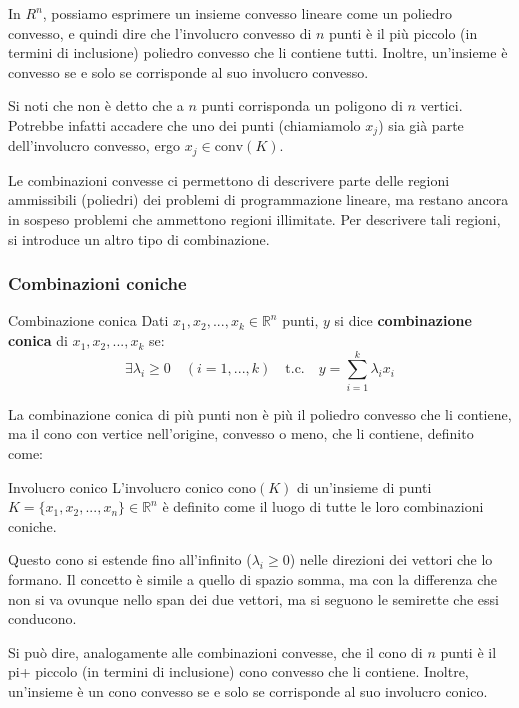 \documentclass[a4paper,11pt]{article}
\begin{document}
In $R^n$, possiamo esprimere un insieme convesso lineare come un poliedro convesso, e quindi dire che l'involucro convesso di $n$ punti è il più piccolo (in termini di inclusione) poliedro convesso che li contiene tutti.
Inoltre, un'insieme è convesso se e solo se corrisponde al suo involucro convesso.

Si noti che non è detto che a $n$ punti corrisponda un poligono di $n$ vertici.
Potrebbe infatti accadere che uno dei punti (chiamiamolo $x_j$) sia già parte dell'involucro convesso, ergo $x_j \in \mathrm{conv}(K)$.

Le combinazioni convesse ci permettono di descrivere parte delle regioni ammissibili (poliedri) dei problemi di programmazione lineare, ma restano ancora in sospeso problemi che ammettono regioni illimitate.
Per descrivere tali regioni, si introduce un altro tipo di combinazione.

\subsubsection{Combinazioni coniche}
\begin{definition}{Combinazione conica}
	Dati $ x_1, x_2, ..., x_k \in \mathbb{R}^n $ punti, $y$ si dice \textbf{combinazione conica} di $ x_1, x_2, ..., x_k $ se:
	$$
	\exists \lambda_i \geq 0 \quad (i = 1, ..., k) \quad \text{t.c.} \quad y = \sum_{i=1}^k \lambda_i x_i 
	$$
\end{definition}

La combinazione conica di più punti non è più il poliedro convesso che li contiene, ma il cono con vertice nell'origine, convesso o meno, che li contiene, definito come:
\begin{definition}{Involucro conico}
	L'involucro conico $\mathrm{cono}(K)$ di un'insieme di punti $K = \{x_1, x_2, ..., x_n\} \in \mathbb{R}^n$ è definito come il luogo di tutte le loro combinazioni coniche.
\end{definition}

Questo cono si estende fino all'infinito ($\lambda_i \geq 0$) nelle direzioni dei vettori che lo formano.
Il concetto è simile a quello di spazio somma, ma con la differenza che non si va ovunque nello span dei due vettori, ma si seguono le semirette che essi conducono.

Si può dire, analogamente alle combinazioni convesse, che il cono di $n$ punti è il pi+ piccolo (in termini di inclusione) cono convesso che li contiene.
Inoltre, un'insieme è un cono convesso se e solo se corrisponde al suo involucro conico.
\end{document}
